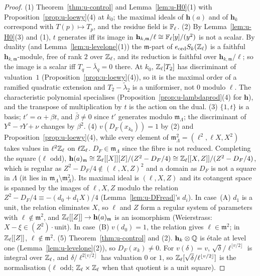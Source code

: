\documentclass[11pt]{article}
\newcommand{\Iw}{\Lambda}                         %
\newcommand{\hcusp}{\mathbf{h}}                   %
\newcommand{\Zl}{\Z_\ell}
\begin{document}
\begin{proof}
(1) Theorem~\ref{thm:u-control} and Lemma~\ref{lem:u-H0}(1) with Proposition~\ref{prop:u-loewy}(4) at $k_0$; the maximal ideals of $\hcusp(a)$ and of $\hcusp_k$ correspond with
$T(p)\mapsto T_p$, and the residue field is $\mathbb{F}_\ell$. (2) By Lemma~\ref{lem:u-H0}(3) and (1), $t$ generates iff its image in $\hcusp_{k,\mathfrak m}/\ell\cong\Fl[y]/(y^{2})$ is not
a scalar. By duality (and Lemma~\ref{lem:u-levelone}(1)) the $\mathfrak m$-part of $\eord S_k(\Zl)$ is a faithful $\hcusp_{k,\mathfrak m}$-module,
free of rank $2$ over $\Zl$, and its reduction is faithful over $\hcusp_{k,\mathfrak m}/\ell$; so the image is a scalar iff
$T_q-\bar\lambda_q=0$ there. At $k_0$, $\Zl[T_2]$ has discriminant of
valuation~$1$ (Proposition~\ref{prop:u-loewy}(4)), so it is the maximal order of a ramified quadratic extension and $T_2-\tilde\lambda_2$ is a uniformiser, not $0$ modulo $\ell$. The characteristic polynomial
specialises (Proposition~\ref{prop:u-lambdaprod}(4) for $\hcusp$), and the transpose of multiplication by $t$ is the action on the dual. (3) $\{1,t\}$ is a basis;
$t'=\alpha+\beta t$, and $\bar\beta\ne0$ since $t'$ generates modulo $\mathfrak m_\Iw$; the discriminant of $Y^{2}-\tau Y+\nu$ changes by $\beta^{2}$. (4) $v(D_F(x_{k_0}))=1$ by (2) and
Proposition~\ref{prop:u-loewy}(4), while every element of $\mathfrak m_\Iw^{2}=(\ell^{2},\ell X,X^{2})$ takes values in $\ell^{2}\Zl$ on $\ell\Zl$. $D_F\in\mathfrak m_\Iw$ since the fibre is not
reduced. Completing the square ($\ell$ odd), $\hcusp(a)_{\mathfrak m}\cong\Zl[[X]][Z]/(Z^{2}-D_F/4)\cong\Zl[[X,Z]]/(Z^{2}-D_F/4)$, which is regular as $Z^{2}-D_F/4\notin(\ell,X,Z)^{2}$
and a domain as $D_F$ is not a square in $\Iw$ (it lies in $\mathfrak m_\Iw\setminus\mathfrak m_\Iw^{2}$). Its maximal ideal is $(\ell,X,Z)$ and its cotangent space is spanned by the images of $\ell,X,Z$
modulo the relation $Z^{2}-D_F/4\equiv-(d_0+d_1X)/4$ (Lemma~\ref{lem:u-DFread}'s $d_i$). In case~(A) $d_1$ is a unit, the relation eliminates $X$, so $\ell$ and $Z$ form a regular system of
parameters with $\ell\notin\mathfrak m^{2}$, and $\Zl[[Z]]\to\hcusp(a)_{\mathfrak m}$ is an isomorphism (Weierstrass: $X-\xi\in(Z^{2})\cdot$unit). In case~(B) $v(d_0)=1$, the relation gives $\ell\in\mathfrak m^{2}$;
in $\Zl[[Z]]$, $\ell\notin\mathfrak m^{2}$. (5) Theorem~\ref{thm:u-control} and (2). $\hcusp_k\otimes\Q$ is étale at level one (Lemma~\ref{lem:u-levelone}(2)), so $D_F(x_k)\ne0$. For $v(\delta)=v$,
$\sqrt\delta/\ell^{\lfloor v/2\rfloor}$ is integral over $\Zl$, and $\delta/\ell^{2\lfloor v/2\rfloor}$ has
valuation $0$ or $1$, so $\Zl[\sqrt\delta/\ell^{\lfloor v/2\rfloor}]$ is the normalisation ($\ell$ odd; $\Zl\times\Zl$ when that quotient is a unit
square).
\end{proof}
\end{document}
